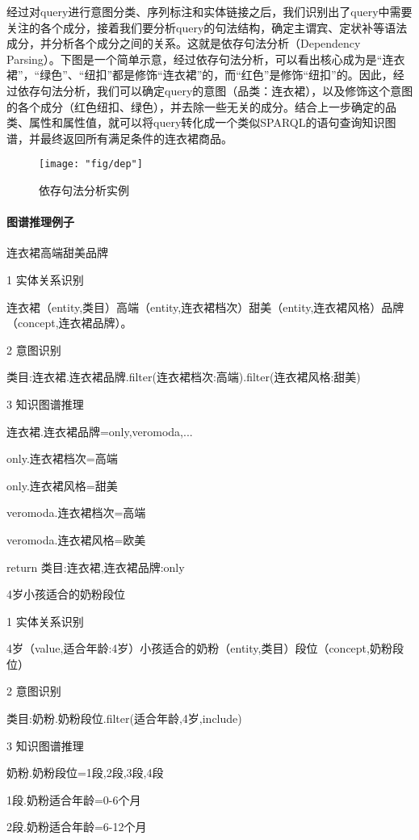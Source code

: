 经过对query进行意图分类、序列标注和实体链接之后，我们识别出了query中需要关注的各个成分，接着我们要分析query的句法结构，确定主谓宾、定状补等语法成分，并分析各个成分之间的关系。这就是依存句法分析（Dependency Parsing）。下图是一个简单示意，经过依存句法分析，可以看出核心成为是“连衣裙”，“绿色”、“纽扣”都是修饰“连衣裙”的，而“红色”是修饰“纽扣”的。因此，经过依存句法分析，我们可以确定query的意图（品类：连衣裙），以及修饰这个意图的各个成分（红色纽扣、绿色），并去除一些无关的成分。结合上一步确定的品类、属性和属性值，就可以将query转化成一个类似SPARQL的语句查询知识图谱，并最终返回所有满足条件的连衣裙商品。

\begin{figure}[h]
	\centering
	\texttt{[image: "fig/dep"]}
	\caption{依存句法分析实例}
	\label{fig:dep}
\end{figure}

\paragraph{图谱推理例子}

连衣裙高端甜美品牌

1 实体关系识别

连衣裙（entity,类目）高端（entity,连衣裙档次）甜美（entity,连衣裙风格）品牌（concept,连衣裙品牌）。

2 意图识别

类目:连衣裙.连衣裙品牌.filter(连衣裙档次:高端).filter(连衣裙风格:甜美)

3 知识图谱推理

连衣裙.连衣裙品牌=only,veromoda,...

only.连衣裙档次=高端

only.连衣裙风格=甜美

veromoda.连衣裙档次=高端

veromoda.连衣裙风格=欧美

return 类目:连衣裙,连衣裙品牌:only

4岁小孩适合的奶粉段位

1 实体关系识别

4岁（value,适合年龄:4岁）小孩适合的奶粉（entity,类目）段位（concept,奶粉段位）

2 意图识别

类目:奶粉.奶粉段位.filter(适合年龄,4岁,include)

3 知识图谱推理

奶粉.奶粉段位=1段,2段,3段,4段

1段.奶粉适合年龄=0-6个月

2段.奶粉适合年龄=6-12个月

